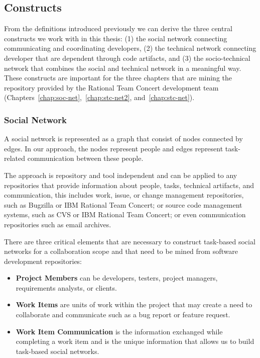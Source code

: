 \subsection{Constructs}
\label{c5:sec:constructs}
From the definitions introduced previously we can derive the three central constructs we work with in this thesis: (1) the social network connecting communicating and coordinating developers, (2) the technical network connecting developer that are dependent through code artifacts, and (3) the socio-technical network that combines the social and technical network in a meaningful way.
These constructs are important for the three chapters that are mining the repository provided by the Rational Team Concert development team (Chapters~\ref{chap:soc-net},~\ref{chap:stc-net2}, and~\ref{chap:stc-net}).

\subsubsection{Social Network}
A social network is represented as a graph that consist of nodes connected by edges. 
In our approach, the nodes represent people and edges represent task-related communication between these people.

The approach is repository and tool independent and can be applied to any repositories that provide information about people, tasks, technical artifacts, and communication, this includes work, issue, or change management repositories, such as Bugzilla or IBM Rational Team Concert; or source code management systems, such as CVS or IBM Rational Team Concert; or even communication repositories such as email archives.

There are three critical elements that are necessary to construct task-based social networks for a collaboration scope and that need to be mined from software development repositories:

\begin{itemize}
\item\textbf{Project Members}  can be developers, testers, project managers, requirements analysts,
or clients. 

\item\textbf{Work Items} are units of work within the project that may create a need to collaborate and communicate such as a bug report or feature request.

\item\textbf{Work Item Communication} is the information exchanged while completing a work item and is the unique information that allows us to build task-based social networks.
\end{itemize}

